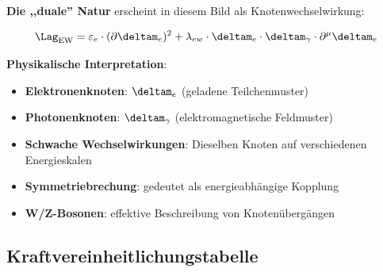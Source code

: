 	\textbf{Die ,,duale'' Natur} erscheint in diesem Bild als Knotenwechselwirkung:
	
	\begin{equation}
		\Lag_{\text{EW}} = \varepsilon_e \cdot (\partial \deltam_e)^2 + \lambda_{ew} \cdot \deltam_e \cdot \deltam_\gamma \cdot \partial^\mu \deltam_e
	\end{equation}
	
	\textbf{Physikalische Interpretation}:
	\begin{itemize}
		\item \textbf{Elektronenknoten}: $\deltam_e$ (geladene Teilchenmuster)
		\item \textbf{Photonenknoten}: $\deltam_\gamma$ (elektromagnetische Feldmuster)
		\item \textbf{Schwache Wechselwirkungen}: Dieselben Knoten auf verschiedenen Energieskalen
		\item \textbf{Symmetriebrechung}: gedeutet als energieabhängige Kopplung
		\item \textbf{W/Z-Bosonen}: effektive Beschreibung von Knotenübergängen
	\end{itemize}
	
	\subsection{Kraftvereinheitlichungstabelle}
	
	\begin{table}[htbp]
		\centering
		\caption{Kraftvereinheitlichung: Standardmodell vs. T0-Knotentheorie}
		\label{tab:force_unification}
	\end{table}
	

